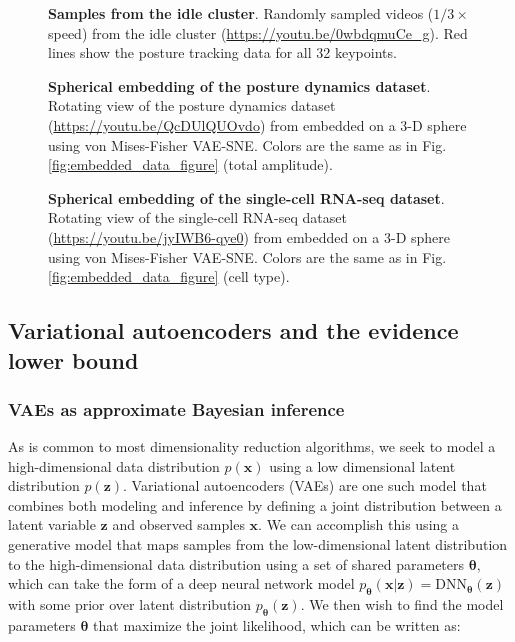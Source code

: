 \documentclass[11pt,a4paper,oneside]{book}
\begin{document}
\begin{appendices}
\begin{figure}[!htb]
\caption{
\textbf{Samples from the idle cluster}. Randomly sampled videos ($1/3 \times$ speed) from the idle cluster (\href{https://youtu.be/0wbdqmuCe_g}{https://youtu.be/0wbdqmuCe\_g}). Red lines show the posture tracking data for all 32 keypoints.}
\label{fig:idle_video}
\end{figure}

\begin{figure}[!htb]
\caption{
\textbf{Spherical embedding of the posture dynamics dataset}. Rotating view of the posture dynamics dataset (\href{https://youtu.be/QcDUlQUOvdo}{https://youtu.be/QcDUlQUOvdo}) from \cite{berman2014mapping, berman2016predictability, pereira2019fast} embedded on a 3-D sphere using von Mises-Fisher VAE-SNE. Colors are the same as in Fig. \ref{fig:embedded_data_figure} (total amplitude).
}
\label{fig:spherical_embedding_posture_video}
\end{figure}

\begin{figure}[!htb]
\caption{
\textbf{Spherical embedding of the single-cell RNA-seq dataset}. Rotating view of the single-cell RNA-seq dataset (\href{https://youtu.be/jyIWB6-qye0}{https://youtu.be/jyIWB6-qye0}) from \cite{la2018rna} embedded on a 3-D sphere using von Mises-Fisher VAE-SNE. Colors are the same as in Fig. \ref{fig:embedded_data_figure} (cell type).
}
\label{fig:spherical_embedding_rna_video}
\end{figure}

\subsection{Variational autoencoders and the evidence lower bound}


\subsubsection{VAEs as approximate Bayesian inference}
\label{appendix:vae}
As is common to most dimensionality reduction algorithms, we seek to model a high-dimensional data distribution $p(\mathbf{x})$ using a low dimensional latent distribution $p(\mathbf{z})$. Variational autoencoders (VAEs) are one such model that combines both modeling and inference by defining a joint distribution between a latent variable $\mathbf{z}$ and observed samples $\mathbf{x}$. We can accomplish this using a generative model that maps samples from the low-dimensional latent distribution to the high-dimensional data distribution using a set of shared parameters $\boldsymbol{\theta}$, which can take the form of a deep neural network model $p_{\boldsymbol{\theta}}(\mathbf{x} | \mathbf{z}) = \mathrm{DNN}_{\boldsymbol{\theta}}(\mathbf{z})$ with some prior over latent distribution $p_{\boldsymbol{\theta}}(\mathbf{z})$. We then wish to find the model parameters $\boldsymbol{\theta}$ that maximize the joint likelihood, which can be written as:


\end{appendices}
\end{document}
